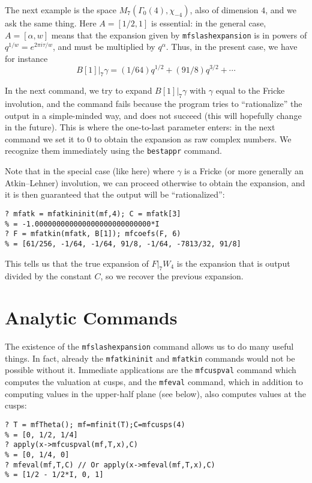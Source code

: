 \documentclass[11pt]{article}
\newcommand{\al}{\alpha}
\newcommand{\ga}{\gamma}
\newcommand{\G}{\Gamma}
\def\kbd#1{{\tt #1}}
\begin{document}
  The next example is the space $M_7(\G_0(4),\chi_{-4})$, also of
  dimension $4$, and we ask the same thing. Here $A=[1/2,1]$ is essential:
  in the general case, $A=[\al,w]$ means that the expansion given
  by \kbd{mfslashexpansion} is in powers of $q^{1/w}=e^{2\pi i\tau/w}$,
  and must be multiplied by $q^{\al}$. Thus, in the present case, we have
  for instance
  $$B[1]|_7\ga=(1/64)q^{1/2}+(91/8)q^{3/2}+\cdots$$

  In the next command, we try to expand $B[1]|_7\ga$ with $\ga$ equal to
  the Fricke involution, and the command fails because the program tries
  to ``rationalize'' the output in a simple-minded way, and does not
  succeed (this will hopefully change in the future). This is where the
  one-to-last parameter enters: in the next command we set it to $0$ to
  obtain the expansion as raw complex numbers. We recognize them immediately
  using the \kbd{bestappr} command.

  Note that in the special case (like here) where $\ga$ is a Fricke (or more
  generally an Atkin--Lehner) involution, we can proceed otherwise to obtain
  the expansion, and it is then guaranteed that the output will be
  ``rationalized'':

\begin{verbatim}
? mfatk = mfatkininit(mf,4); C = mfatk[3]
% = -1.000000000000000000000000000*I
? F = mfatkin(mfatk, B[1]); mfcoefs(F, 6)
% = [61/256, -1/64, -1/64, 91/8, -1/64, -7813/32, 91/8]
\end{verbatim}

  This tells us that the true expansion of $F|_7W_4$ is the expansion that
  is output divided by the constant $C$, so we recover the previous
  expansion.

\section{Analytic Commands}

The existence of the \kbd{mfslashexpansion} command allows us to do many
useful things. In fact, already the \kbd{mfatkininit} and \kbd{mfatkin}
commands would not be possible without it. Immediate applications are the
\kbd{mfcuspval} command which computes the valuation at cusps, and the
\kbd{mfeval} command, which in addition to computing values in the upper-half
plane (see below), also computes values at the cusps:

\begin{verbatim}
? T = mfTheta(); mf=mfinit(T);C=mfcusps(4)
% = [0, 1/2, 1/4]
? apply(x->mfcuspval(mf,T,x),C)
% = [0, 1/4, 0]
? mfeval(mf,T,C) // Or apply(x->mfeval(mf,T,x),C)
% = [1/2 - 1/2*I, 0, 1]
\end{verbatim}
\end{document}
